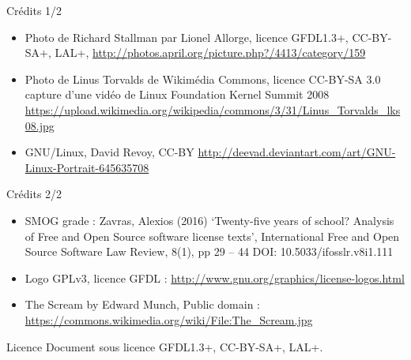 \documentclass{beamer}
\begin{document}
\begin{frame}{Crédits 1/2}
  \begin{itemize}
  \item Photo de Richard Stallman par Lionel Allorge, licence
    GFDL1.3+, CC-BY-SA+, LAL+,
    \url{http://photos.april.org/picture.php?/4413/category/159}
  \item Photo de Linus Torvalds de Wikimédia Commons, licence CC-BY-SA
    3.0 capture d'une vidéo de Linux Foundation Kernel Summit 2008
    \url{https://upload.wikimedia.org/wikipedia/commons/3/31/Linus_Torvalds_lks08.jpg}
  \item GNU/Linux, David Revoy, CC-BY
    \url{http://deevad.deviantart.com/art/GNU-Linux-Portrait-645635708}
  \end{itemize}
\end{frame}


\begin{frame}{Crédits 2/2}
  \begin{itemize}
  \item SMOG grade : Zavras, Alexios (2016) ‘Twenty-five years of
    school? Analysis of Free and Open Source software license texts’,
    International Free and Open Source Software Law Review, 8(1), pp
    29 – 44 DOI: 10.5033/ifosslr.v8i1.111
  \item Logo GPLv3, licence GFDL :
    \url{http://www.gnu.org/graphics/license-logos.html}
  \item The Scream by Edward Munch, Public domain :
    \url{https://commons.wikimedia.org/wiki/File:The_Scream.jpg}

  \end{itemize}
\end{frame}



\begin{frame}{Licence}
  Document sous licence GFDL1.3+, CC-BY-SA+, LAL+.
\end{frame}
\end{document}
